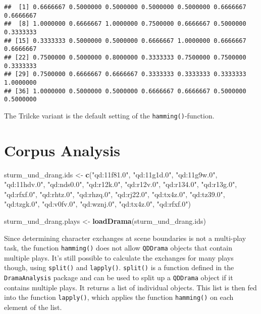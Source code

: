 \documentclass[]{book}
\newenvironment{Shaded}{\begin{snugshade}}{\end{snugshade}}
\newcommand{\KeywordTok}[1]{\textcolor[rgb]{0.13,0.29,0.53}{\textbf{#1}}}
\newcommand{\NormalTok}[1]{#1}
\newcommand{\StringTok}[1]{\textcolor[rgb]{0.31,0.60,0.02}{#1}}
\begin{document}
\begin{verbatim}
##  [1] 0.6666667 0.5000000 0.5000000 0.5000000 0.5000000 0.6666667 0.6666667
##  [8] 1.0000000 0.6666667 1.0000000 0.7500000 0.6666667 0.5000000 0.3333333
## [15] 0.3333333 0.5000000 0.5000000 0.6666667 1.0000000 0.6666667 0.6666667
## [22] 0.7500000 0.5000000 0.8000000 0.3333333 0.7500000 0.7500000 0.3333333
## [29] 0.7500000 0.6666667 0.6666667 0.3333333 0.3333333 0.3333333 1.0000000
## [36] 1.0000000 0.5000000 0.5000000 0.6666667 0.6666667 0.5000000 0.5000000
\end{verbatim}

The Trilcke variant is the default setting of the \texttt{hamming()}-function.

\hypertarget{corpus-analysis}{%
\section{Corpus Analysis}\label{corpus-analysis}}

\begin{Shaded}
\begin{Highlighting}[]
\NormalTok{sturm_und_drang.ids <-}\StringTok{ }\KeywordTok{c}\NormalTok{(}\StringTok{"qd:11f81.0"}\NormalTok{, }\StringTok{"qd:11g1d.0"}\NormalTok{, }\StringTok{"qd:11g9w.0"}\NormalTok{, }
                         \StringTok{"qd:11hdv.0"}\NormalTok{, }\StringTok{"qd:nds0.0"}\NormalTok{,  }\StringTok{"qd:r12k.0"}\NormalTok{, }
                         \StringTok{"qd:r12v.0"}\NormalTok{,  }\StringTok{"qd:r134.0"}\NormalTok{,  }\StringTok{"qd:r13g.0"}\NormalTok{, }
                         \StringTok{"qd:rfxf.0"}\NormalTok{,  }\StringTok{"qd:rhtz.0"}\NormalTok{,  }\StringTok{"qd:rhzq.0"}\NormalTok{, }
                         \StringTok{"qd:rj22.0"}\NormalTok{,  }\StringTok{"qd:tx4z.0"}\NormalTok{,  }\StringTok{"qd:tz39.0"}\NormalTok{, }
                         \StringTok{"qd:tzgk.0"}\NormalTok{,  }\StringTok{"qd:v0fv.0"}\NormalTok{,  }\StringTok{"qd:wznj.0"}\NormalTok{, }
                         \StringTok{"qd:tx4z.0"}\NormalTok{,  }\StringTok{"qd:rfxf.0"}\NormalTok{)}

\NormalTok{sturm_und_drang.plays <-}\StringTok{ }\KeywordTok{loadDrama}\NormalTok{(sturm_und_drang.ids)}
\end{Highlighting}
\end{Shaded}

Since determining character exchanges at scene boundaries is not a multi-play task, the function \texttt{hamming()} does not allow \texttt{QDDrama} objects that contain multiple plays. It's still possible to calculate the exchanges for many plays though, using \texttt{split()} and \texttt{lapply()}. \texttt{split()} is a function defined in the \texttt{DramaAnalysis} package and can be used to split up a \texttt{QDDrama} object if it contains multiple plays. It returns a list of individual objects. This list is then fed into the function \texttt{lapply()}, which applies the function \texttt{hamming()} on each element of the list.
\end{document}
